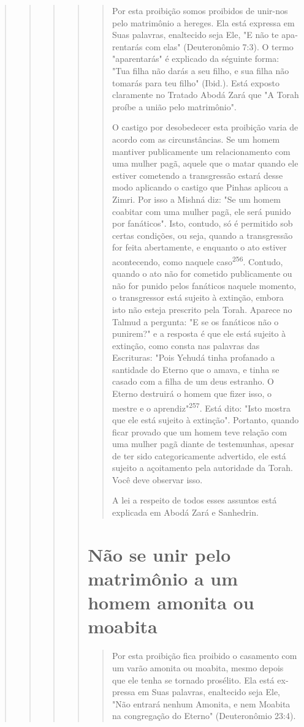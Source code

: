 \begin{quote}
\begin{quote}
\begin{quote}
\begin{quote}
\begin{quote}
Por esta proibição somos proibidos de unir-nos pelo matrimônio a
hereges. Ela está expressa em Suas palavras, enaltecido seja Ele, "E não
te apa­rentarás com elas" (Deuteronômio 7:3). O termo "aparentarás" é
explicado da séguinte forma: "Tua filha não darás a seu filho, e sua
filha não tomarás para teu filho" (Ibid.). Está exposto claramente no
Tratado Abodá Zará que "A To­rah proíbe a união pelo matrimônio".

O castigo por desobedecer esta proibição varia de acordo com as
circunstâncias. Se um homem mantiver publicamente um relacionamento com
uma mulher pagã, aquele que o matar quando ele estiver cometendo a
trans­gressão estará desse modo aplicando o castigo que Pinhas aplicou a
Zimri. Por isso a Mishná diz: "Se um homem coabitar com uma mulher pagã,
ele será pu­nido por fanáticos". Isto, contudo, só é permitido sob
certas condições, ou se­ja, quando a transgressão for feita abertamente,
e enquanto o ato estiver acon­tecendo, como naquele
caso\textsuperscript{256}. Contudo, quando o ato não for cometido
pu­blicamente ou não for punido pelos fanáticos naquele momento, o
transgres­sor está sujeito à extinção, embora isto não esteja prescrito
pela Torah. Apare­ce no Talmud a pergunta: "E se os fanáticos não o
punirem?" e a resposta é que ele está sujeito à extinção, como consta
nas palavras das Escrituras: "Pois Yehudá tinha profanado a santidade do
Eterno que o amava, e tinha se casado com a filha de um deus estranho. O
Eterno destruirá o homem que fizer isso, o mestre e o
aprendiz"\textsuperscript{257}. Está dito: "Isto mostra que ele está
sujeito à extin­ção". Portanto, quando ficar provado que um homem teve
relação com uma mulher pagã diante de testemunhas, apesar de ter sido
categoricamente adver­tido, ele está sujeito a açoitamento pela
autoridade da Torah. Você deve obser­var isso.

A lei a respeito de todos esses assuntos está explicada em Abodá Za­rá e
Sanhedrin.
\end{quote}

\section{Não se unir pelo matrimônio a um homem amonita ou moabita}

\begin{quote}
Por esta proibição fica proibido o casamento com um varão amoni­ta ou
moabita, mesmo depois que ele tenha se tornado prosélito. Ela está
ex­pressa em Suas palavras, enaltecido seja Ele, "Não entrará nenhum
Amonita, e nem Moabita na congregação do Eterno" (Deuteronômio 23:4).


\end{quote}
\end{quote}
\end{quote}
\end{quote}
\end{quote}
